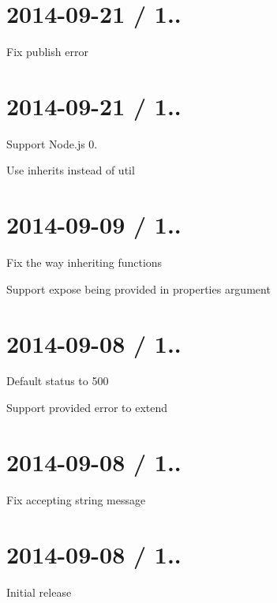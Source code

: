 \section*{2014-\/09-\/21 / 1.. }


\begin{DoxyItemize}
\item Fix publish error
\end{DoxyItemize}

\section*{2014-\/09-\/21 / 1.. }


\begin{DoxyItemize}
\item Support Node.\+js 0.
\item Use {\ttfamily inherits} instead of {\ttfamily util}
\end{DoxyItemize}

\section*{2014-\/09-\/09 / 1.. }


\begin{DoxyItemize}
\item Fix the way inheriting functions
\item Support {\ttfamily expose} being provided in properties argument
\end{DoxyItemize}

\section*{2014-\/09-\/08 / 1.. }


\begin{DoxyItemize}
\item Default status to 500
\item Support provided {\ttfamily error} to extend
\end{DoxyItemize}

\section*{2014-\/09-\/08 / 1.. }


\begin{DoxyItemize}
\item Fix accepting string message
\end{DoxyItemize}

\section*{2014-\/09-\/08 / 1.. }


\begin{DoxyItemize}
\item Initial release 
\end{DoxyItemize}